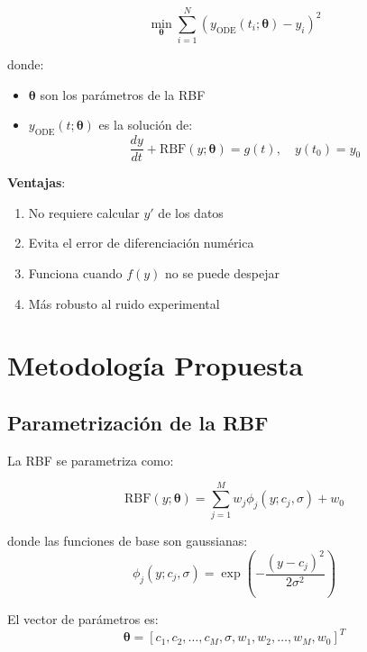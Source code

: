 \documentclass[11pt,a4paper]{article}
\begin{document}
\begin{equation}
\min_{\boldsymbol{\theta}} \sum_{i=1}^{N} \left( y_{\text{ODE}}(t_i; \boldsymbol{\theta}) - y_i \right)^2
\label{eq:optimization_problem}
\end{equation}

donde:
\begin{itemize}
    \item $\boldsymbol{\theta}$ son los parámetros de la RBF
    \item $y_{\text{ODE}}(t; \boldsymbol{\theta})$ es la solución de:
    \begin{equation}
    \frac{dy}{dt} + \text{RBF}(y; \boldsymbol{\theta}) = g(t), \quad y(t_0) = y_0
    \end{equation}
\end{itemize}

\textbf{Ventajas}:
\begin{enumerate}
    \item No requiere calcular $y'$ de los datos
    \item Evita el error de diferenciación numérica
    \item Funciona cuando $f(y)$ no se puede despejar
    \item Más robusto al ruido experimental
\end{enumerate}

\section{Metodología Propuesta}

\subsection{Parametrización de la RBF}

La RBF se parametriza como:

\begin{equation}
\text{RBF}(y; \boldsymbol{\theta}) = \sum_{j=1}^{M} w_j \phi_j(y; c_j, \sigma) + w_0
\end{equation}

donde las funciones de base son gaussianas:
\begin{equation}
\phi_j(y; c_j, \sigma) = \exp\left(-\frac{(y - c_j)^2}{2\sigma^2}\right)
\end{equation}

El vector de parámetros es:
\begin{equation}
\boldsymbol{\theta} = [c_1, c_2, \ldots, c_M, \sigma, w_1, w_2, \ldots, w_M, w_0]^T
\label{eq:parameters}
\end{equation}
\end{document}
